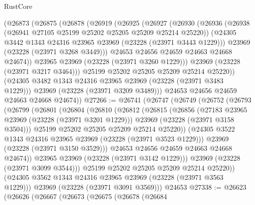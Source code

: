 \begin{lexlean}{RustCore}
\begin{coremodule}
        (@26873
          (@26875
            (@26878
              (@26919
                (@26925
                  (@26927
                    (@26930
                      (@26936
                        (@26938 (@26941 @27105 @25199 @25202 @25205 @25209 @25214 @25220))
                        (@24305 @3442 @1343 @24316 @23965 @23969 (@23228 (@23971 @3443 @1229)))
                        @23969
                        (@23228 (@23971 @3268 @3449)))
                      @24653
                      @24656
                      @24659
                      @24663
                      @24668
                      @24674))
                  @23965
                  @23969
                  (@23228 (@23971 @3260 @1229)))
                @23969
                (@23228 (@23971 @3217 @3464)))
              @25199
              @25202
              @25205
              @25209
              @25214
              @25220))
          (@24305 @3482 @1343 @24316 @23965 @23969 (@23228 (@23971 @3483 @1229)))
          @23969
          (@23228 (@23971 @3209 @3489)))
        @24653
        @24656
        @24659
        @24663
        @24668
        @24674))
@27266 := @26741
    (@26747
      (@26749
        (@26752
          (@26793
            (@26799
              (@26801
                (@26804
                  (@26810
                    (@26812
                      (@26815
                        (@26856
                          (@27183 @23965 @23969 (@23228 (@23971 @3201 @1229)))
                          @23969
                          (@23228 (@23971 @3158 @3504)))
                        @25199
                        @25202
                        @25205
                        @25209
                        @25214
                        @25220))
                    (@24305 @3522 @1343 @24316 @23965 @23969 (@23228 (@23971 @3523 @1229)))
                    @23969
                    (@23228 (@23971 @3150 @3529)))
                  @24653
                  @24656
                  @24659
                  @24663
                  @24668
                  @24674))
              @23965
              @23969
              (@23228 (@23971 @3142 @1229)))
            @23969
            (@23228 (@23971 @3099 @3544)))
          @25199
          @25202
          @25205
          @25209
          @25214
          @25220))
      (@24305 @3562 @1343 @24316 @23965 @23969 (@23228 (@23971 @3563 @1229)))
      @23969
      (@23228 (@23971 @3091 @3569)))
    @24653
@27338 := @26623
    (@26626
      (@26667
        (@26673
          (@26675
            (@26678
              (@26684

\end{coremodule}
\end{lexlean}
